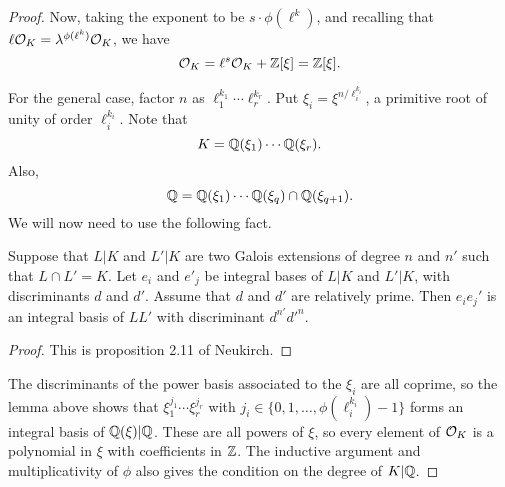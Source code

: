 \begin{proof}
  Now, taking the exponent to be $s \cdot \phi(\ell^{k})$, and recalling that $\ell \mathcal{O}_{K} = \lambda^{\phi(\ell^{k})} \mathcal{O}_{K}$, we have
  \[ \mathcal{O}_{K} = \ell^{s} \mathcal{O}_{K} + \mathbb{Z}[\xi] = \mathbb{Z}[\xi]. \]

  For the general case, factor $n$ as $\ell_{1}^{k_{1}} \cdots \ell_{r}^{k_{r}}$.
  Put $\xi_{i} = \xi^{n/\ell_{i}^{k_{i}}}$, a primitive root of unity of order $\ell_{i}^{k_{i}}$.
  Note that
  \[ K = \mathbb{Q}(\xi_{1}) \cdots \mathbb{Q}(\xi_{r}). \]
  Also,
  \[ \mathbb{Q} = \mathbb{Q}(\xi_{1}) \cdots \mathbb{Q}(\xi_{q}) \cap \mathbb{Q}(\xi_{q+1}). \]
  We will now need to use the following fact.
  \begin{lemma}
    Suppose that $L|K$ and $L'|K$ are two Galois extensions of degree $n$ and $n'$ such that $L \cap L' = K$.
    Let $e_{i}$ and $e'_{j}$ be integral bases of $L|K$ and $L'|K$, with discriminants $d$ and $d'$.
    Assume that $d$ and $d'$ are relatively prime.
    Then $e_{i}e_{j}'$ is an integral basis of $LL'$ with discriminant $d^{n'}d'^{n}$.
  \end{lemma}
  \begin{proof}
    This is proposition 2.11 of Neukirch.
  \end{proof}

  The discriminants of the power basis associated to the $\xi_{i}$ are all coprime, so the lemma above shows that $\xi_{1}^{j_{1}} \cdots \xi_{r}^{j_{r}}$ with $j_{i} \in \{0,1,\ldots,\phi(\ell_{i}^{k_{i}})-1\}$ forms an integral basis of $\mathbb{Q}(\xi)|\mathbb{Q}$.
  These are all powers of $\xi$, so every element of $\mathcal{O}_{K}$ is a polynomial in $\xi$ with coefficients in $\mathbb{Z}$.
  The inductive argument and multiplicativity of $\phi$ also gives the condition on the degree of $K|\mathbb{Q}$.
\end{proof}

